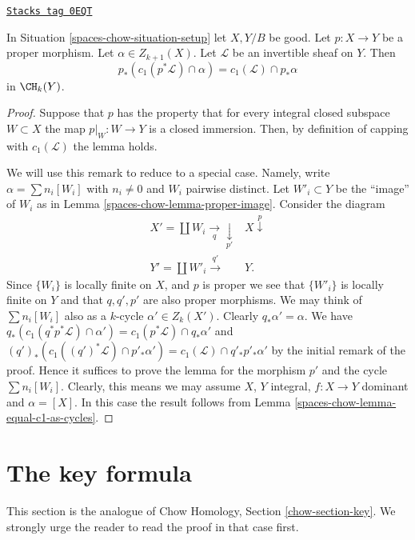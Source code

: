 \begin{lemma}
\label{spaces-chow-lemma-pushforward-cap-c1}
\href{https://stacks.math.columbia.edu/tag/0EQT}{\texttt{Stacks tag 0EQT}}

In Situation \ref{spaces-chow-situation-setup} let $X, Y/B$ be good.
Let $p : X \to Y$ be a proper morphism.
Let $\alpha \in Z_{k + 1}(X)$.
Let $\mathcal{L}$ be an invertible sheaf on $Y$.
Then
$$
p_*(c_1(p^*\mathcal{L}) \cap \alpha) = c_1(\mathcal{L}) \cap p_*\alpha
$$
in $\CH_k(Y)$.
\end{lemma}

\begin{proof}
Suppose that $p$ has the property that for every integral
closed subspace $W \subset X$ the map $p|_W : W \to Y$
is a closed immersion. Then, by definition of capping
with $c_1(\mathcal{L})$ the lemma holds.

\medskip\noindent
We will use this remark to reduce to a special case. Namely,
write $\alpha = \sum n_i[W_i]$ with $n_i \not = 0$ and $W_i$ pairwise
distinct. Let $W'_i \subset Y$ be the ``image'' of $W_i$ as
in Lemma \ref{spaces-chow-lemma-proper-image}. Consider the diagram
$$
\begin{array}{cc}X' = \coprod W_i \underset{q}{\longrightarrow}\underset{p'}{\downarrow} & X \overset{p}{\downarrow} \\ Y' = \coprod W'_i \overset{q'}{\longrightarrow} & Y.\end{array}
$$
Since $\{W_i\}$ is locally finite on $X$, and $p$ is proper
we see that $\{W'_i\}$ is locally finite on $Y$ and that
$q, q', p'$ are also proper morphisms.
We may think of $\sum n_i[W_i]$ also as a $k$-cycle
$\alpha' \in Z_k(X')$. Clearly $q_*\alpha' = \alpha$.
We have
$q_*(c_1(q^*p^*\mathcal{L}) \cap \alpha')
= c_1(p^*\mathcal{L}) \cap q_*\alpha'$
and
$(q')_*(c_1((q')^*\mathcal{L}) \cap p'_*\alpha') =
c_1(\mathcal{L}) \cap q'_*p'_*\alpha'$ by the initial
remark of the proof. Hence it suffices to prove the lemma
for the morphism $p'$ and the cycle $\sum n_i[W_i]$.
Clearly, this means we may assume $X$, $Y$ integral,
$f : X \to Y$ dominant and $\alpha = [X]$.
In this case the result follows from
Lemma \ref{spaces-chow-lemma-equal-c1-as-cycles}.
\end{proof}

\section{The key formula}
\label{spaces-chow-section-key}
This section is the analogue of Chow Homology, Section \ref{chow-section-key}.
We strongly urge the reader to read the proof in that case first.

